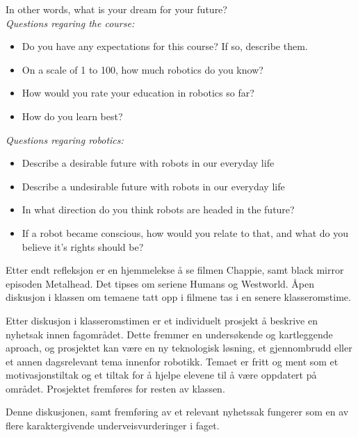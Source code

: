 \begin{itemize}
\begin{itemize}
            \end{itemize}
            In other words, what is your dream for your future?\\

            \emph{Questions regaring the course:}
            \begin{itemize}

                \item Do you have any expectations for this course? If so, describe them.
                \item On a scale of 1 to 100, how much robotics do you know?
                \item How would you rate your education in robotics so far?
                \item How do you learn best?

            \end{itemize}

            \emph{Questions regaring robotics:}
            \begin{itemize}

                \item Describe a desirable future with robots in our everyday life
                \item Describe a undesirable future with robots in our everyday life
                \item In what direction do you think robots are headed in the future?
                \item If a robot became conscious, how would you relate to that, and what do you believe it's rights should be?

            \end{itemize}
        Etter endt refleksjon er en hjemmelekse å se filmen Chappie, samt black mirror episoden Metalhead. Det tipses om seriene Humans og Westworld. Åpen diskusjon i klassen om temaene tatt opp i filmene tas i en senere klasseromstime.

        Etter diskusjon i klasseromstimen er et individuelt prosjekt å beskrive en nyhetsak innen fagområdet. Dette fremmer en undersøkende og kartleggende aproach, og prosjektet kan være en ny teknologisk løsning, et gjennombrudd eller et annen dagsrelevant tema innenfor robotikk. Temaet er fritt og ment som et motivasjonstiltak og et tiltak for å hjelpe elevene til å være oppdatert på området. Prosjektet fremføres for resten av klassen.

        Denne diskusjonen, samt fremføring av et relevant nyhetssak fungerer som en av flere karaktergivende underveisvurderinger i faget.

    \end{itemize}
